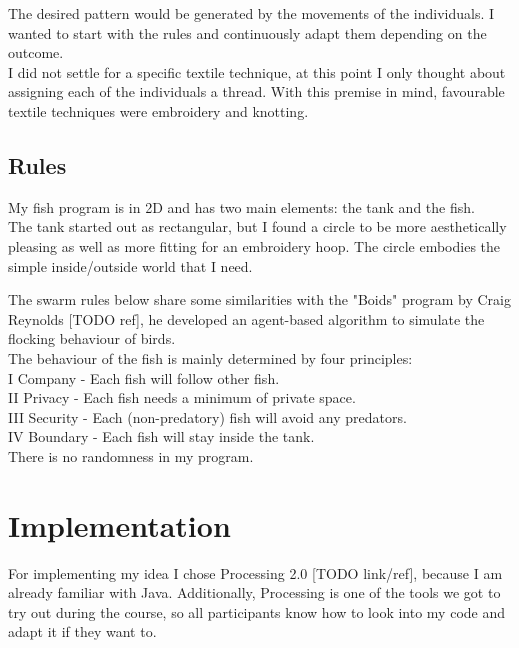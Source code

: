 \documentclass{scrartcl}
\begin{document}
The desired pattern would be generated by the movements of the individuals. I wanted to start with the rules and continuously adapt them depending on the outcome.\\
I did not settle for a specific textile technique, at this point I only thought about assigning each of the individuals a thread. With this premise in mind, favourable textile techniques were embroidery and knotting.


\subsection{Rules}

My fish program is in 2D and has two main elements: the tank and the fish.\\

The tank started out as rectangular, but I found a circle to be more aesthetically pleasing as well as more fitting for an embroidery hoop. The circle embodies the simple inside/outside world that I need.

The swarm rules below share some similarities with the "Boids" program by Craig Reynolds [TODO ref], he developed an agent-based algorithm to simulate the flocking behaviour of birds.\\

The behaviour of the fish is mainly determined by four principles:\\
I Company - Each fish will follow other fish.\\
II Privacy - Each fish needs a minimum of private space.\\
III Security - Each (non-predatory) fish will avoid any predators.\\
IV Boundary - Each fish will stay inside the tank.\\

There is no randomness in my program.

\section{Implementation}

For implementing my idea I chose Processing 2.0 [TODO link/ref], because I am already familiar with Java. Additionally, Processing is one of the tools we got to try out during the course, so all participants know how to look into my code and adapt it if they want to.\\
\end{document}

